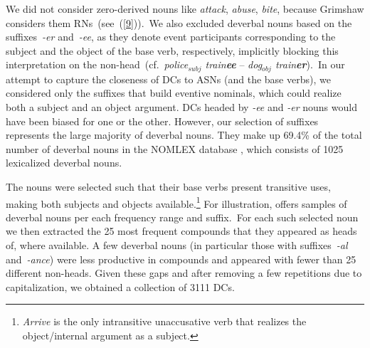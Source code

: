 \documentclass[output=paper]{langsci/langscibook}
\begin{document}
We  {did not} consider zero-derived nouns like \textit{attack}, \textit{abuse}, \textit{bite}, because Grimshaw considers them RNs~(see\ (\ref{9})).\ 
We also excluded deverbal nouns based on the suffixes~\mbox{\textit{-er}} and~\mbox{\textit{-ee}}, as they denote event participants corresponding to the subject and the object of the base verb, respectively, implicitly blocking this interpretation on the non-head~(cf.\ \textit{police$_{subj}$ train\textbf{ee}} -- \textit{dog$_{obj}$ train\textbf{er}}).\ In our attempt to capture the closeness of DCs to ASNs (and the base verbs), we considered only the suffixes that build eventive nominals, which could realize both a subject and an object argument. DCs headed by \textit{-ee} and \textit{-er} nouns would have been biased for one or the other. However, our selection of suffixes represents the large majority of deverbal nouns. They make up 69.4\% of the total number of deverbal nouns in the NOMLEX database \citep{NOMLEX:98}, which consists of 1025 lexicalized deverbal nouns.


The nouns were selected such that their base verbs present transitive uses, making both subjects and objects available.\footnote{\textit{Arrive} is the only intransitive unaccusative verb that realizes the object/internal argument as a subject.} For illustration,  offers  samples of deverbal nouns per each frequency range and suffix.\ For each such selected noun we then extracted the 25 most frequent compounds that they appeared as heads of, where available. A few deverbal nouns (in particular those with suffixes~\mbox{\textit{-al}} and~\mbox{\textit{-ance}}) were less productive in compounds and appeared with fewer than 25 different non-heads. Given these gaps and after removing a few repetitions due to capitalization, we obtained a collection of 3111 DCs.
\end{document}
